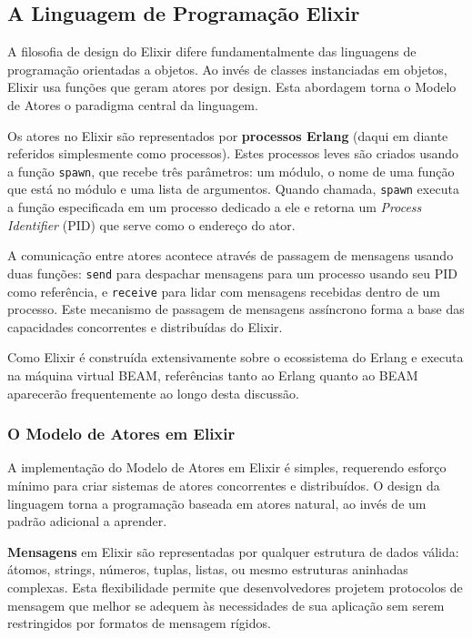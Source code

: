 \subsection{A Linguagem de Programação Elixir}

A filosofia de design do Elixir difere fundamentalmente das linguagens de programação orientadas a objetos. Ao invés de classes instanciadas em objetos, Elixir usa funções que geram atores por design. Esta abordagem torna o Modelo de Atores o paradigma central da linguagem.

Os atores no Elixir são representados por \textbf{processos Erlang} (daqui em diante referidos simplesmente como processos). Estes processos leves são criados usando a função \texttt{spawn}, que recebe três parâmetros: um módulo, o nome de uma função que está no módulo e uma lista de argumentos. Quando chamada, \texttt{spawn} executa a função especificada em um processo dedicado a ele e retorna um \emph{Process Identifier} (PID) que serve como o endereço do ator.

A comunicação entre atores acontece através de passagem de mensagens usando duas funções: \texttt{send} para despachar mensagens para um processo usando seu PID como referência, e \texttt{receive} para lidar com mensagens recebidas dentro de um processo. Este mecanismo de passagem de mensagens assíncrono forma a base das capacidades concorrentes e distribuídas do Elixir.

Como Elixir é construída extensivamente sobre o ecossistema do Erlang e executa na máquina virtual BEAM, referências tanto ao Erlang quanto ao BEAM aparecerão frequentemente ao longo desta discussão.

\subsubsection{O Modelo de Atores em Elixir}

A implementação do Modelo de Atores em Elixir é simples, requerendo esforço mínimo para criar sistemas de atores concorrentes e distribuídos. O design da linguagem torna a programação baseada em atores natural, ao invés de um padrão adicional a aprender.

\textbf{Mensagens} em Elixir são representadas por qualquer estrutura de dados válida: átomos, strings, números, tuplas, listas, ou mesmo estruturas aninhadas complexas. Esta flexibilidade permite que desenvolvedores projetem protocolos de mensagem que melhor se adequem às necessidades de sua aplicação sem serem restringidos por formatos de mensagem rígidos.


